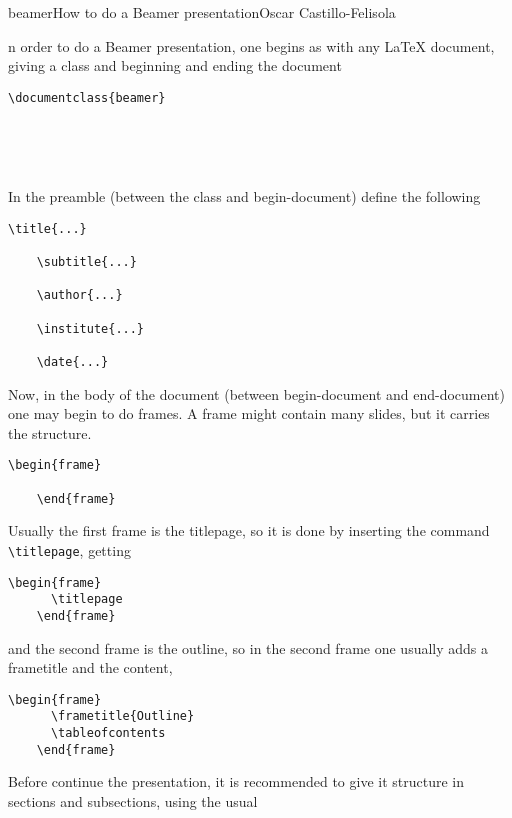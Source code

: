 \begin{article}[2]{beamer}{How to do a Beamer presentation}{Oscar Castillo-Felisola}

  n order to do a Beamer presentation, one begins as with any LaTeX document, giving a class and beginning and ending the document
  \begin{lstlisting}[style=LaTeX]
    \documentclass{beamer}

    

    
  \end{lstlisting}

  In the preamble (between the class and begin-document) define the following
  \begin{lstlisting}[style=LaTeX]
    \title{...}

    \subtitle{...}

    \author{...}

    \institute{...}

    \date{...}
  \end{lstlisting}

  Now, in the body of the document (between begin-document and end-document)  one may begin to do frames. A frame might contain many slides, but it carries the structure.
  \begin{lstlisting}[style=LaTeX]
    \begin{frame}

    \end{frame}
  \end{lstlisting}

  Usually the first frame is the titlepage, so it is done by inserting the command \lstinline[style=LaTeX]!\titlepage!, getting
  \begin{lstlisting}[style=LaTeX]
    \begin{frame}
      \titlepage
    \end{frame}
  \end{lstlisting}
  and the second frame is the outline, so in the second frame one usually adds a frametitle and the content,
  \begin{lstlisting}[style=LaTeX]
    \begin{frame}
      \frametitle{Outline}
      \tableofcontents
    \end{frame}
  \end{lstlisting}

  Before continue the presentation, it is recommended to give it structure in sections and subsections, using the usual
  \begin{lstlisting}[style=LaTeX]

\end{lstlisting}
\end{article}
